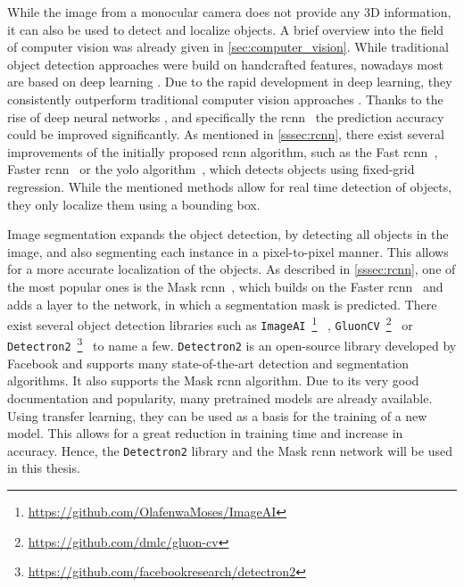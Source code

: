 While the image from a monocular camera does not provide any 3D information, it can also be used to detect and localize objects.
A brief overview into the field of computer vision was already given in \cref{sec:computer_vision}.
While traditional object detection approaches were build on handcrafted features, nowadays most are based on deep learning \cite{Zhao2019}.
Due to the rapid development in deep learning, they consistently outperform traditional computer vision approaches \cite{Mahony2019}.
Thanks to the rise of deep neural networks \cite{Krizhevsky2017}, and specifically the \gls{rcnn}~\cite{Girshick2014} the prediction accuracy could be improved significantly.
As mentioned in \cref{sssec:rcnn}, there exist several improvements of the initially proposed \gls{rcnn} algorithm, such as the Fast \gls{rcnn}~\cite{Girshick2015}, Faster \gls{rcnn}~\cite{Ren2017} or the \gls{yolo} algorithm~\cite{Redmon2016}, which detects objects using fixed-grid regression.
While the mentioned methods allow for real time detection of objects, they only localize them using a bounding box.

Image segmentation expands the object detection, by detecting all objects in the image, and also segmenting each instance in a pixel-to-pixel manner.
This allows for a more accurate localization of the objects.
As described in \cref{sssec:rcnn}, one of the most popular ones is the Mask \gls{rcnn}~\cite{He2017}, which builds on the Faster \gls{rcnn}~\cite{Ren2017} and adds a layer to the network, in which a segmentation mask is predicted.
There exist several object detection libraries such as \texttt{ImageAI}~\footnote{\url{https://github.com/OlafenwaMoses/ImageAI}}~\cite{Olafenwa2018} , \texttt{GluonCV}~\footnote{\url{https://github.com/dmlc/gluon-cv}}~\cite{Guo2020} or \texttt{Detectron2}~\footnote{\url{https://github.com/facebookresearch/detectron2}}~\cite{Wu2019} to name a few.
\texttt{Detectron2} is an open-source library developed by Facebook and supports many state-of-the-art detection and segmentation algorithms.
It also supports the Mask \gls{rcnn} algorithm.
Due to its very good documentation and popularity, many pretrained models are already available.
Using transfer learning, they can be used as a basis for the training of a new model.
This allows for a great reduction in training time and increase in accuracy.
Hence, the \texttt{Detectron2} library and the Mask \gls{rcnn} network will be used in this thesis.